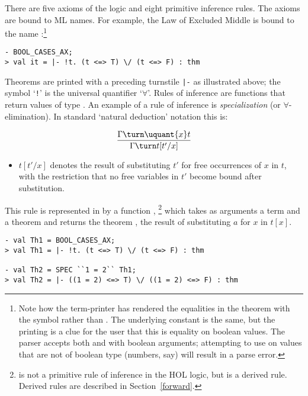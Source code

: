 There are five axioms of the \HOL{} logic and eight primitive inference rules.
The axioms are bound to ML names.
For example, the Law of Excluded Middle is bound to the \ML{} name :\footnote{%
Note how the term-printer has rendered the equalities in the theorem with the \holtxt{<=>} symbol rather than \holtxt{=}.
The underlying constant is the same, but the printing is a clue for the user that this is equality on boolean values.
The parser accepts both \holtxt{<=>} and \holtxt{=} with boolean arguments; attempting to use \holtxt{<=>} on values that are not of boolean type (numbers, say) will result in a parse error.%
}

\begin{session}
\begin{verbatim}
- BOOL_CASES_AX;
> val it = |- !t. (t <=> T) \/ (t <=> F) : thm
\end{verbatim}
\end{session}


Theorems are printed with a preceding turnstile {\small\verb+|-+} as illustrated above; the symbol `{\small\verb|!|}' is the universal quantifier `$\forall$'.
Rules of inference are \ML{} functions that return values of type .
An example of a rule of inference is {\it specialization\/} (or $\forall$-elimination).
In standard `natural deduction' notation this is:

\[ \frac{\Gamma\turn \uquant{x}t}{\Gamma\turn t[t'/x]}\]

\begin{itemize}
\item $t[t'/x]$ denotes the result of substituting $t'$ for free occurrences of $x$ in $t$, with the restriction that no free variables in $t'$ become bound after substitution.
\end{itemize}

\noindent This rule is represented in \ML{} by a function ,%
\footnote{ is not a primitive rule of inference in the HOL logic, but is a derived rule.
Derived rules are described in Section~\ref{forward}.}
which takes as arguments a term  and a theorem  and returns the theorem , the result of substituting $a$ for $x$ in $t[x]$.

\begin{session}
\begin{verbatim}
- val Th1 = BOOL_CASES_AX;
> val Th1 = |- !t. (t <=> T) \/ (t <=> F) : thm

- val Th2 = SPEC ``1 = 2`` Th1;
> val Th2 = |- ((1 = 2) <=> T) \/ ((1 = 2) <=> F) : thm
\end{verbatim}
\end{session}

